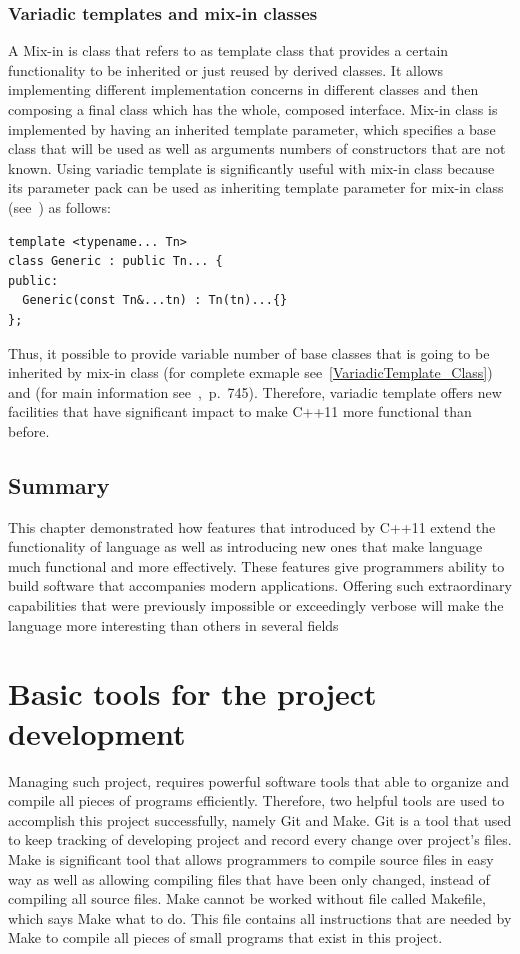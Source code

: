\documentclass[11pt]{report}
\begin{document}
\subsection{Variadic templates and mix-in classes}
\label{subsection: Variadic Templates and Mix-In Classes}
A Mix-in is class that refers to as template class that provides a certain functionality to be inherited or just reused by derived classes. It allows implementing different implementation concerns in different classes and then composing a final class which has the whole, composed interface. Mix-in class is implemented by having an inherited template parameter, which specifies a base class that will be used as well as arguments numbers of constructors that are not known. Using variadic template is significantly useful with mix-in class because its parameter pack can be used as inheriting template parameter for mix-in class (see~\cite{Gregor:2007:VTC}) as follows:
\begin{lstlisting}
template <typename... Tn>
class Generic : public Tn... {
public:
  Generic(const Tn&...tn) : Tn(tn)...{}
};
\end{lstlisting}
Thus, it possible to provide variable number of base classes that is going to be inherited by mix-in class (for complete exmaple see~\ref{VariadicTemplate_Class}) and (for main information see~\cite{Gregorie:professionalcpp},~p.~745). Therefore, variadic template offers new facilities that have significant impact to make C++11 more functional than before.

\section{Summary}
\label{section1: Summary}
This chapter demonstrated how features that introduced by C++11 extend the functionality of language as well as introducing new ones that make language much functional and more effectively. These features give programmers ability to build software that accompanies modern applications. Offering such extraordinary capabilities that were previously impossible or exceedingly verbose will make the language more interesting than others in several fields

\chapter{Basic tools for the project development}
\label{cha: tools}
Managing such project, requires powerful software tools that able to organize and compile all pieces of programs efficiently. Therefore, two helpful tools are used to accomplish this project successfully, namely Git and Make. Git is a tool that used to keep tracking of developing project and record every change over project's files. Make is significant tool that allows programmers to compile source files in easy way as well as allowing compiling files that have been only changed, instead of compiling all source files. Make cannot be worked without file called Makefile, which says Make what to do. This file contains all instructions that are needed by Make to compile all pieces of small programs that exist in this project.
\end{document}
